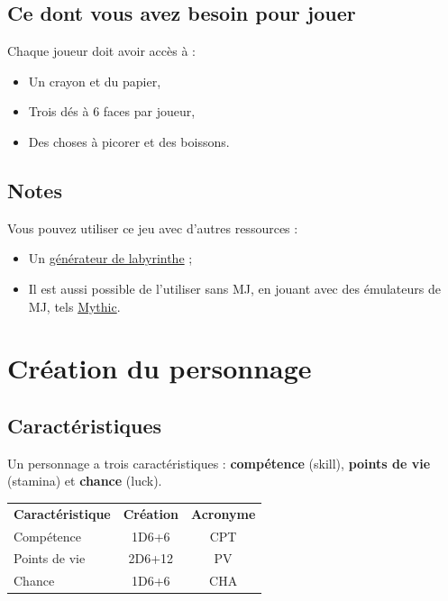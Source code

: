 \documentclass[a4paper, 11pt, twoside]{article}
\begin{document}
\subsection{Ce dont vous avez besoin pour jouer}
\label{sec:org4a1e0d6}

Chaque joueur doit avoir accès à :
\begin{itemize}
\item Un crayon et du papier,
\item Trois dés à 6 faces par joueur,
\item Des choses à picorer et des boissons.
\end{itemize}

\subsection{Notes}
\label{sec:org083fee1}

Vous pouvez utiliser ce jeu avec d'autres ressources :
\begin{itemize}
\item Un \href{https://github.com/orey/jdr/tree/master/G\%25C3\%25A9n\%25C3\%25A9rateurLabyrinthe}{générateur de labyrinthe} ;
\item Il est aussi possible de l'utiliser sans MJ, en jouant avec des émulateurs de MJ, tels \href{https://github.com/orey/jdr/tree/master/Mythic-fr}{Mythic}.
\end{itemize}

\section{Création du personnage}
\label{sec:orgeb51132}

\subsection{Caractéristiques}
\label{sec:orgbbbf915}

Un personnage a trois caractéristiques : \textbf{compétence} (skill), \textbf{points de vie} (stamina)  et \textbf{chance} (luck).

\begin{longtable}{lcc}
\textbf{Caractéristique} & \textbf{Création} & \textbf{Acronyme}\\
Compétence & 1D6+6 & CPT\\
Points de vie & 2D6+12 & PV\\
Chance & 1D6+6 & CHA\\
\end{longtable}
\end{document}
